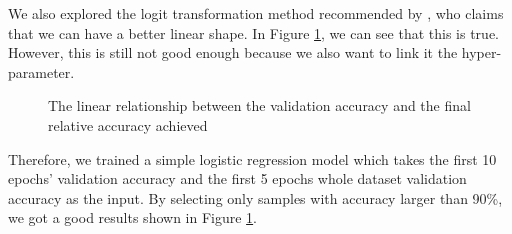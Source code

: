 We also explored the logit transformation method recommended by \cite{Kornblith2018}, who claims that we can have a better linear shape. In Figure \ref{Fig.training_trend}, we can see that this is true. However, this is still not good enough because we also want to link it the hyper-parameter.

\begin{figure}[H]
\centering  
{}
\caption{The linear relationship between the validation accuracy and the final relative accuracy achieved}
\label{Fig.training_trend}
\end{figure}

Therefore, we trained a simple logistic regression model which takes the first 10 epochs' validation accuracy and the first 5 epochs whole dataset validation accuracy as the input. By selecting only samples with accuracy larger than 90\%, we got a good results shown in Figure \ref{Fig.training_trend}.

